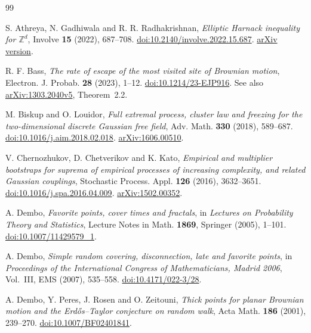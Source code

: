 \documentclass[12pt,reqno]{amsart}
\theoremstyle{plain}
\theoremstyle{definition}
\theoremstyle{remark}
\numberwithin{equation}{section}
\begin{document}
\clearpage
\begin{thebibliography}{99}
\raggedright

S. Athreya, N. Gadhiwala and R. R. Radhakrishnan,
\emph{Elliptic Harnack inequality for $\mathbb Z^d$},
Involve \textbf{15} (2022), 687--708.
\href{https://doi.org/10.2140/involve.2022.15.687}{doi:10.2140/involve.2022.15.687}.
\href{https://arxiv.org/abs/2201.11947}{arXiv version}.

R. F. Bass,
\emph{The rate of escape of the most visited site of Brownian motion},
Electron. J. Probab. \textbf{28} (2023), 1--12.
\href{https://doi.org/10.1214/23-EJP916}{doi:10.1214/23-EJP916}.
See also \href{https://arxiv.org/abs/1303.2040v5}{arXiv:1303.2040v5},
Theorem~2.2.

M. Biskup and O. Louidor,
\emph{Full extremal process, cluster law and freezing for the two-dimensional
discrete Gaussian free field},
Adv. Math. \textbf{330} (2018), 589--687.
\href{https://doi.org/10.1016/j.aim.2018.02.018}{doi:10.1016/j.aim.2018.02.018}.
\href{https://arxiv.org/abs/1606.00510}{arXiv:1606.00510}.

V. Chernozhukov, D. Chetverikov and K. Kato,
\emph{Empirical and multiplier bootstraps for suprema of empirical processes
of increasing complexity, and related Gaussian couplings},
Stochastic Process. Appl. \textbf{126} (2016), 3632--3651.
\href{https://doi.org/10.1016/j.spa.2016.04.009}{doi:10.1016/j.spa.2016.04.009}.
\href{https://arxiv.org/abs/1502.00352}{arXiv:1502.00352}.

A. Dembo,
\emph{Favorite points, cover times and fractals},
in \emph{Lectures on Probability Theory and Statistics},
Lecture Notes in Math. \textbf{1869}, Springer (2005), 1--101.
\href{https://doi.org/10.1007/11429579_1}{doi:10.1007/11429579\_1}.

A. Dembo,
\emph{Simple random covering, disconnection, late and favorite points},
in \emph{Proceedings of the International Congress of Mathematicians,
Madrid 2006}, Vol.~III, EMS (2007), 535--558.
\href{https://doi.org/10.4171/022-3/28}{doi:10.4171/022-3/28}.

A. Dembo, Y. Peres, J. Rosen and O. Zeitouni,
\emph{Thick points for planar Brownian motion and the Erd\H{o}s--Taylor
conjecture on random walk},
Acta Math. \textbf{186} (2001), 239--270.
\href{https://doi.org/10.1007/BF02401841}{doi:10.1007/BF02401841}.


\end{thebibliography}
\end{document}
